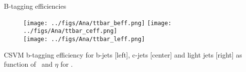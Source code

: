 \begin{frame}{B-tagging efficiencies}
\vspace{-.2cm}
\begin{figure}[!Hhtbp]
  \begin{center}
    \texttt{[image: ../figs/Ana/ttbar\_beff.png]}
    \texttt{[image: ../figs/Ana/ttbar\_ceff.png]}\\
    \texttt{[image: ../figs/Ana/ttbar\_leff.png]}
  \end{center}
\end{figure}

\vspace{-.5cm}
    \begin{block}{}
      \tiny \centering CSVM b-tagging efficiency for b-jets [left], c-jets [center] and light jets [right] as function of \pt~and $\eta$ for \ttbar.
    \end{block}

\end{frame}

